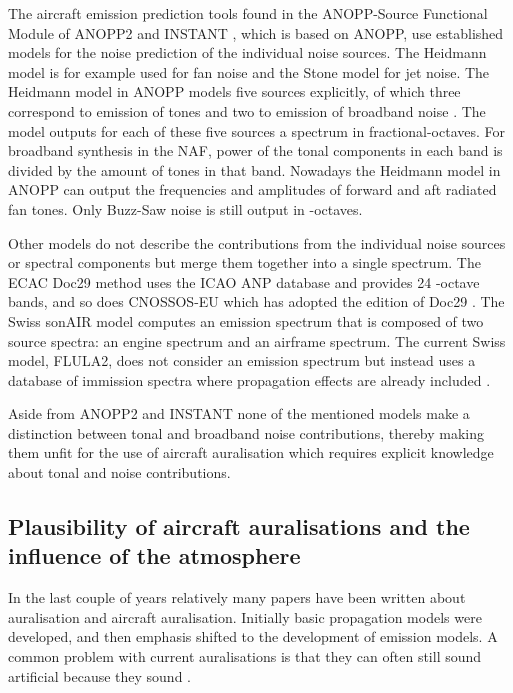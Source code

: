 The aircraft emission prediction tools found in the ANOPP-Source Functional
Module of ANOPP2 \cite{Lopes2016, Tuttle2017} and INSTANT \cite{Sahai2016b}, which is based
on ANOPP, use established models for the noise prediction of the individual
noise sources. The Heidmann model is for example used for fan noise and the
Stone model for jet noise. The Heidmann model in ANOPP models
five sources explicitly, of which three correspond to emission of tones and two
to emission of broadband noise \cite{Arntzen2014a}. The model outputs for each
of these five sources a spectrum in fractional-octaves.
For broadband synthesis in the NAF\cite{Aumann2015}, power of the tonal
components in each band is divided by the amount of tones in that band.
Nowadays the Heidmann model in ANOPP can output the frequencies and amplitudes
of forward and aft radiated fan tones. Only Buzz-Saw noise is still output in
-octaves.


Other models do not describe the contributions from the individual noise
sources or spectral components but merge them together into a single spectrum.
The ECAC Doc29 method \cite{Doc29_fourth_2016} uses the ICAO ANP database and
provides 24 -octave bands, and so does CNOSSOS-EU which has
adopted the  edition of Doc29 \cite{Doc29_third_2005}. The Swiss sonAIR
model \cite{Zellmann2016} computes an emission spectrum that is composed of two
source spectra: an engine spectrum and an airframe spectrum. The current Swiss
model, FLULA2, does not consider an emission spectrum but instead uses a database
of immission spectra where propagation effects are already included
\cite{EMPA2010,Schaffer2014}.

Aside from ANOPP2 and INSTANT none of the mentioned models make a distinction
between tonal and broadband noise contributions, thereby making them unfit for the use of
aircraft auralisation which requires explicit knowledge about tonal and noise
contributions.

\subsection{Plausibility of aircraft auralisations and the influence of the atmosphere}
In the last couple of years relatively many papers have been written about
auralisation and aircraft auralisation. Initially basic propagation models were
developed, and then emphasis shifted to the development of emission models. A
common problem with current auralisations is that they can often still sound
artificial because they sound .


